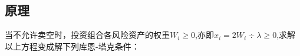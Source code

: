 

\subsection{原理}
当不允许卖空时，投资组合各风险资产的权重$W_i\geqslant 0$,亦即$x_i=2W_i\div\lambda\geqslant0$,求解以上方程变成解下列库恩-塔克条件：
